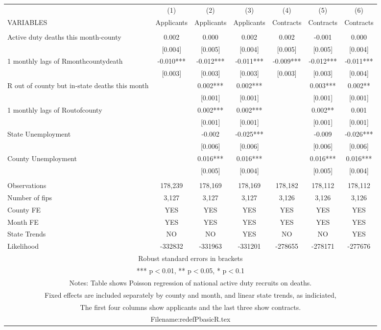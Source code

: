 \documentclass[]{article}
\begin{document}
\begin{tabular}{lcccccc} \hline
 & (1) & (2) & (3) & (4) & (5) & (6) \\
VARIABLES & Applicants & Applicants & Applicants & Contracts & Contracts & Contracts \\ \hline
 &  &  &  &  &  &  \\
Active duty deaths this month-county & 0.002 & 0.000 & 0.002 & 0.002 & -0.001 & 0.000 \\
 & [0.004] & [0.005] & [0.004] & [0.005] & [0.005] & [0.004] \\
1 monthly lags of Rmonthcountydeath & -0.010*** & -0.012*** & -0.011*** & -0.009*** & -0.012*** & -0.011*** \\
 & [0.003] & [0.003] & [0.003] & [0.003] & [0.003] & [0.004] \\
R out of county but in-state deaths this month &  & 0.002*** & 0.002*** &  & 0.003*** & 0.002** \\
 &  & [0.001] & [0.001] &  & [0.001] & [0.001] \\
1 monthly lags of Routofcounty &  & 0.002*** & 0.002*** &  & 0.002** & 0.001 \\
 &  & [0.001] & [0.001] &  & [0.001] & [0.001] \\
State Unemployment &  & -0.002 & -0.025*** &  & -0.009 & -0.026*** \\
 &  & [0.006] & [0.006] &  & [0.006] & [0.006] \\
County Unemployment &  & 0.016*** & 0.016*** &  & 0.016*** & 0.016*** \\
 &  & [0.005] & [0.004] &  & [0.005] & [0.004] \\
 &  &  &  &  &  &  \\
Observations & 178,239 & 178,169 & 178,169 & 178,182 & 178,112 & 178,112 \\
Number of fips & 3,127 & 3,127 & 3,127 & 3,126 & 3,126 & 3,126 \\
County FE & YES & YES & YES & YES & YES & YES \\
Month FE & YES & YES & YES & YES & YES & YES \\
State Trends & NO & NO & YES & NO & NO & YES \\
 Likelihood & -332832 & -331963 & -331201 & -278655 & -278171 & -277676 \\ \hline
\multicolumn{7}{c}{ Robust standard errors in brackets} \\
\multicolumn{7}{c}{ *** p$<$0.01, ** p$<$0.05, * p$<$0.1} \\
\multicolumn{7}{c}{ Notes: Table shows Poisson regression of national active duty recruits on deaths.} \\
\multicolumn{7}{c}{ Fixed effects are included separately by county and month, and linear state trends, as indiciated,} \\
\multicolumn{7}{c}{ The first four columns show applicants and the last three show contracts.} \\
\multicolumn{7}{c}{ Filename:redefPbasicR.tex} \\
\end{tabular}
\end{document}
